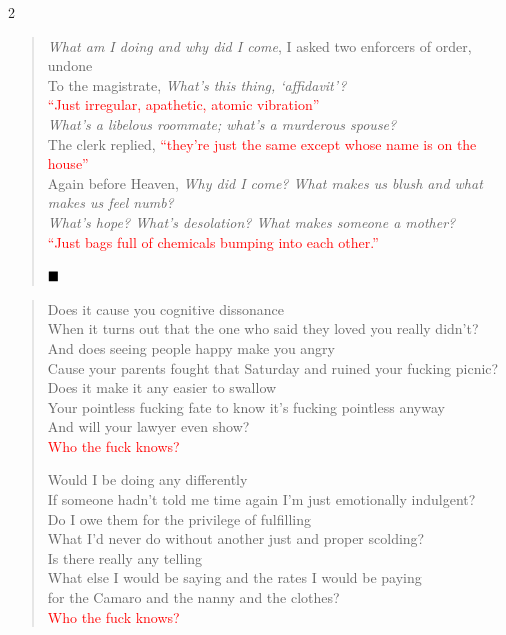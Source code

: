 \documentclass[11pt]{book}
\begin{document}
\begin{multicols}{2}
\begin{verse}
\emph{What am I doing and why did I come}, I asked two enforcers of order, undone \\
To the magistrate, \emph{What's this thing, `affidavit'?} \\
\textcolor{Red}{``Just irregular, apathetic, atomic vibration''} \\
\emph{What's a libelous roommate; what's a murderous spouse?} \\
The clerk replied, \textcolor{Red}{``they're just the same except whose name is on the house''} \\
Again before Heaven, \emph{Why did I come? What makes us blush and what makes us feel numb?} \\
\emph{What's hope? What's desolation? What makes someone a mother?} \\
\textcolor{Red}{``Just bags full of chemicals bumping into each other.''}

$\hfill\blacksquare$
\end{verse}

\begin{verse}

\tiny
Does it cause you cognitive dissonance\\
When it turns out that the one who said they loved you really didn't?\\
And does seeing people happy make you angry\\
Cause your parents fought that Saturday and ruined your fucking picnic?\\
Does it make it any easier to swallow\\
Your pointless fucking fate to know it's fucking pointless anyway\\
And will your lawyer even show?\\
\textcolor{Red}{Who the fuck knows?}

Would I be doing any differently\\
If someone hadn't told me time again I'm just emotionally indulgent?\\
Do I owe them for the privilege of fulfilling\\
What I'd never do without another just and proper scolding?\\
Is there really any telling\\
What else I would be saying and the rates I would be paying\\
for the Camaro and the nanny and the clothes?\\
\textcolor{Red}{Who the fuck knows?}


\end{verse}
\end{multicols}
\end{document}
